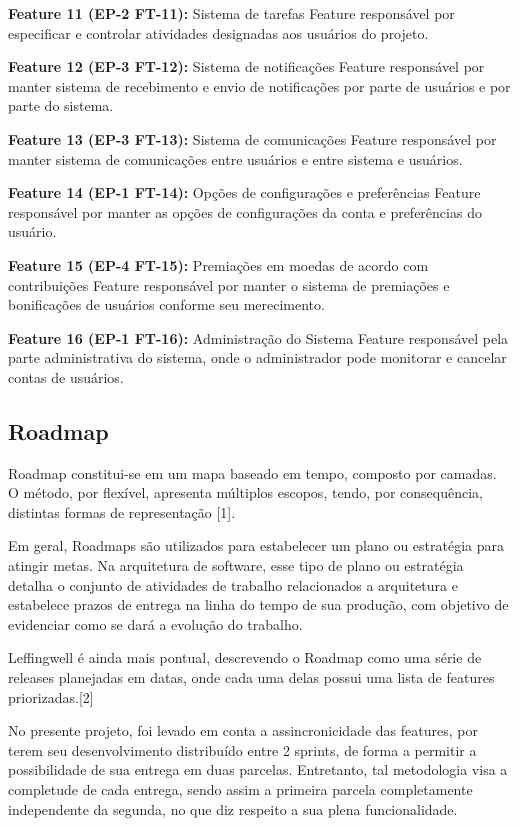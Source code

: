 \textbf{Feature 11 (EP-2 FT-11):} Sistema de tarefas
Feature responsável por especificar e controlar atividades designadas aos usuários do projeto.

\textbf{Feature 12 (EP-3 FT-12):} Sistema de notificações
Feature responsável por manter sistema de recebimento e envio de notificações por parte de usuários e por parte do sistema.

\textbf{Feature 13 (EP-3 FT-13):} Sistema de comunicações
Feature responsável por manter sistema de comunicações entre usuários e entre sistema e usuários.

\textbf{Feature 14 (EP-1 FT-14):} Opções de configurações e preferências
Feature responsável por manter as opções de configurações da conta e preferências do usuário.

\textbf{Feature 15 (EP-4 FT-15):} Premiações em moedas de acordo com contribuições
Feature responsável por manter o sistema de premiações e bonificações de usuários conforme seu merecimento.

\textbf{Feature 16 (EP-1 FT-16):} Administração do Sistema
Feature responsável pela parte administrativa do sistema, onde o administrador pode monitorar e cancelar contas de usuários.

\subsection{Roadmap}

Roadmap constitui-se em um mapa baseado em tempo, composto por camadas. O método, por flexível, apresenta múltiplos escopos, tendo, por consequência, distintas formas de representação [1].

Em geral, Roadmaps são utilizados para estabelecer um plano ou estratégia para atingir metas. Na arquitetura de software, esse tipo de plano ou estratégia detalha o conjunto de atividades de trabalho relacionados a arquitetura e estabelece prazos de entrega na linha do tempo de sua produção, com objetivo de evidenciar como se dará a evolução do trabalho.

Leffingwell é ainda mais pontual, descrevendo o Roadmap como uma série de releases planejadas em datas, onde cada uma delas possui uma lista de features priorizadas.[2]

No presente projeto, foi levado em conta a assincronicidade das features, por terem seu desenvolvimento distribuído entre 2 sprints, de forma a permitir a possibilidade de sua entrega em duas parcelas. Entretanto, tal metodologia visa a completude de cada entrega, sendo assim a primeira parcela completamente independente da segunda, no que diz respeito a sua plena funcionalidade.

